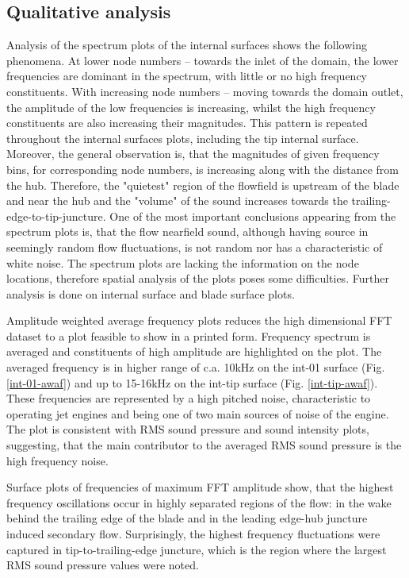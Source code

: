 \subsection{Qualitative analysis} \label{fft_res_qual}
Analysis of the spectrum plots of the internal surfaces shows the following phenomena. At lower node numbers -- towards the inlet of the domain, the lower frequencies are dominant in the spectrum, with little or no high frequency constituents. With increasing node numbers -- moving towards the domain outlet, the amplitude of the low frequencies is increasing, whilst the high frequency constituents are also increasing their magnitudes. This pattern is repeated throughout the internal surfaces plots, including the tip internal surface. Moreover, the general observation is, that the magnitudes of given frequency bins, for corresponding node numbers, is increasing along with the distance from the hub. Therefore, the "quietest" region of the flowfield is upstream of the blade and near the hub and the "volume" of the sound increases towards the trailing-edge-to-tip-juncture. One of the most important conclusions appearing from the spectrum plots is, that the flow nearfield sound, although having source in seemingly random flow fluctuations, is not random nor has a characteristic of white noise. The spectrum plots are lacking the information on the node locations, therefore spatial analysis of the plots poses some difficulties. Further analysis is done on internal surface and blade surface plots.

Amplitude weighted average frequency plots reduces the high dimensional FFT dataset to a plot feasible to show in a printed form. Frequency spectrum is averaged and constituents of high amplitude are highlighted on the plot. The averaged frequency is in higher range of c.a. 10kHz on the int-01 surface (Fig. \ref{int-01-awaf}) and up to 15-16kHz on the int-tip surface (Fig. \ref{int-tip-awaf}). These frequencies are represented by a high pitched noise, characteristic to operating jet engines and being one of two main sources of noise of the engine. The plot is consistent with RMS sound pressure and sound intensity plots, suggesting, that the main contributor to the averaged RMS sound pressure is the high frequency noise.

Surface plots of frequencies of maximum FFT amplitude show, that the highest frequency oscillations occur in highly separated regions of the flow: in the wake behind the trailing edge of the blade and in the leading edge-hub juncture induced secondary flow. Surprisingly, the highest frequency fluctuations were captured in tip-to-trailing-edge juncture, which is the region where the largest RMS sound pressure values were noted.

